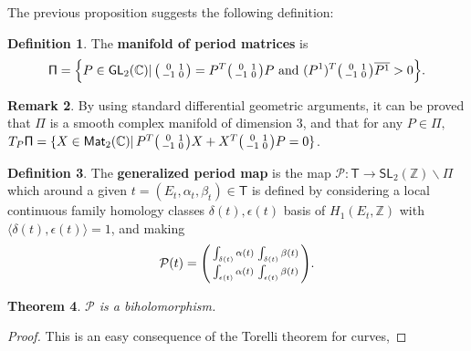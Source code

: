 \documentclass{article}
\numberwithin{equation}{section}
\numberwithin{figure}{section}
\theoremstyle{plain}
\newtheorem{theorem}{Theorem}[section]
\theoremstyle{definition}
\newtheorem{remark}[theorem]{Remark}
\newtheorem{definition}[theorem]{Definition}
\numberwithin{equation}{section}
\newtheorem[S, bodystyle=\normalfont\noindent]{defiS}{Definition}[section]
\begin{document}
The previous proposition suggests the following definition:
\begin{definition}
The \textbf{manifold of period matrices} is 
\begin{equation*}\mathsf{\Pi}=\Big\{P\in \mathsf{GL}_2(\mathbb{C})|\, \begin{psmallmatrix} 0 & 1 \\ -1& 0\end{psmallmatrix}=P^{T}\begin{psmallmatrix} 0 & 1 \\ -1& 0\end{psmallmatrix} P \text{ and } (P^1)^T\begin{psmallmatrix} 0 & 1 \\ -1& 0\end{psmallmatrix}\overline{P^1}>0\Big\}.
\end{equation*}
\end{definition}

\begin{remark}
By using standard differential geometric arguments, it can be proved that $\mathsf{\Pi}$ is a smooth complex manifold of dimension $3$, and that for any $P\in \mathsf{\Pi},$ $T_P\mathsf{\Pi}=\{X\in\mathsf{Mat}_2(\mathbb{C})|\, P^T\begin{psmallmatrix} 0 & 1 \\ -1& 0\end{psmallmatrix} X+X^T\begin{psmallmatrix} 0 & 1 \\ -1& 0\end{psmallmatrix} P=0\}$.
\end{remark}

\begin{definition}
The \textbf{generalized period map} is the map $\mathcal{P}:\mathsf{T}\rightarrow \mathsf{SL}_2(\mathbb{Z})\backslash \mathsf{\Pi}$ which around a given $t=(E_t,\alpha_t,\beta_t)\in\mathsf{T}$ is defined by considering a local continuous family homology classes $\delta(t),\epsilon(t)$ basis of $H_1(E_t,\mathbb{Z})$ with $\langle \delta(t),\epsilon(t)\rangle=1$, and making $$\mathcal{P}(t)=\begin{psmallmatrix}\int_{\delta(t)}\alpha(t) & \int_{\delta(t)}\beta(t)\\\int_{\epsilon(t)}\alpha(t) & \int_{\epsilon(t)}\beta(t)\end{psmallmatrix}.$$
\end{definition}

\begin{theorem}
$\mathcal{P}$ is a biholomorphism.
\end{theorem}
\begin{proof}
This is an easy consequence of the Torelli theorem for curves,
\end{proof}
\end{document}
